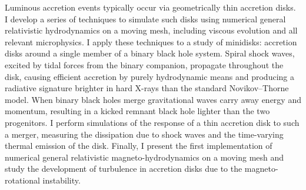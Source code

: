 Luminous accretion events typically occur via geometrically thin accretion disks.  I develop a series of techniques to simulate such disks using numerical general relativistic hydrodynamics on a moving mesh, including viscous evolution and all relevant microphysics.  I apply these techniques to a study of minidisks: accretion disks around a single member of a binary black hole system. Spiral shock waves, excited by tidal forces from the binary companion, propagate throughout the disk, causing efficient accretion by purely hydrodynamic means and producing a radiative signature brighter in hard X-rays than the standard Novikov--Thorne model.
When binary black holes merge gravitational waves carry away energy and momentum, resulting in a kicked remnant black hole lighter than the two progenitors.  I perform simulations of the response of a thin accretion disk to such a merger, measuring the dissipation due to shock waves and the time-varying thermal emission of the disk.
Finally, I present the first implementation of numerical general relativistic magneto-hydrodynamics on a moving mesh and study the development of turbulence in accretion disks due to the magneto-rotational instability.


